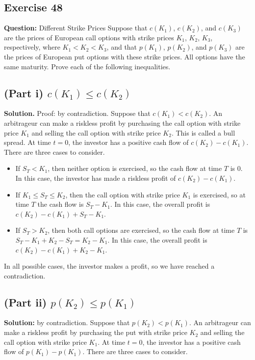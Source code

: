 \documentclass{article}
\begin{document}
\subsection*{Exercise 48}
\textbf{Question:} Different Strike Prices Suppose that $c(K_1)$, $c(K_2)$, and $c(K_3)$ are the prices of European call options with strike prices $K_1$, $K_2$, $K_3$, respectively, where $K_1 < K_2 < K_3$, and that $p(K_1)$, $p(K_2)$, and $p(K_3)$ are the prices of European put options with these strike prices. All options have the same maturity. Prove each of the following inequalities.

\subsection*{(Part i) $c(K_1) \leq c(K_2)$}
\textbf{Solution.} Proof: by contradiction. Suppose that $c(K_1) < c(K_2)$. An arbitrageur can make a riskless profit by purchasing the call option with strike price $K_1$ and selling the call option with strike price $K_2$. This is called a bull spread. At time $t = 0$, the investor has a positive cash flow of $c(K_2) - c(K_1)$. There are three cases to consider.
\begin{itemize}
    \item If $S_T < K_1$, then neither option is exercised, so the cash flow at time $T$ is 0. In this case, the investor has made a riskless profit of $c(K_2) - c(K_1)$.
    \item If $K_1 \leq S_T \leq K_2$, then the call option with strike price $K_1$ is exercised, so at time $T$ the cash flow is $S_T - K_1$. In this case, the overall profit is $c(K_2) - c(K_1) + S_T - K_1$.
    \item If $S_T > K_2$, then both call options are exercised, so the cash flow at time $T$ is $S_T - K_1 + K_2 - S_T = K_2 - K_1$. In this case, the overall profit is $c(K_2) - c(K_1) + K_2 - K_1$.
\end{itemize}
In all possible cases, the investor makes a profit, so we have reached a contradiction.

\subsection*{(Part ii) $p(K_2) \leq p(K_1)$}
\textbf{Solution:} by contradiction. Suppose that $p(K_2) < p(K_1)$. An arbitrageur can make a riskless profit by purchasing the put with strike price $K_2$ and selling the call option with strike price $K_1$. At time $t = 0$, the investor has a positive cash flow of $p(K_1) - p(K_1)$. There are three cases to consider.
\end{document}
